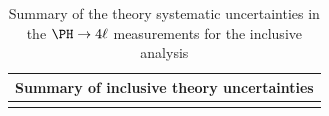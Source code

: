 \begin{table}[!htb]
\begin{center}
\small
\label{tab:SystOverviewTheo_bkg}
\caption{Summary of the theory systematic uncertainties in the $\Hllll$ measurements for the inclusive analysis}
\begin{tabular}{|lc|}
\hline %
\hline %
\multicolumn{2}{|c|}{\textbf{Summary of inclusive theory uncertainties}} \\
\hline %
\hline %
\vspace{-0.4cm} & \\

\end{tabular}
\end{center}
\end{table}
